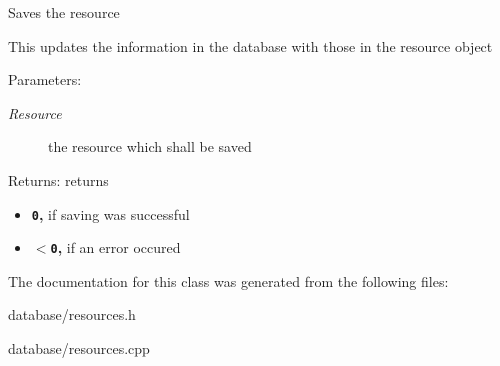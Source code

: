 Saves the resource

This updates the information in the database with those in the resource object

\begin{Desc}
\item[Parameters:]
\begin{description}
\item[{\em Resource}]the resource which shall be saved \end{description}
\end{Desc}
\begin{Desc}
\item[Returns:]returns\begin{itemize}
\item {\bf {\tt 0},} if saving was successful\item {\bf {\tt $<$0},} if an error occured \end{itemize}
\end{Desc}


The documentation for this class was generated from the following files:\begin{CompactItemize}
\item 
database/resources.h\item 
database/resources.cpp\end{CompactItemize}

